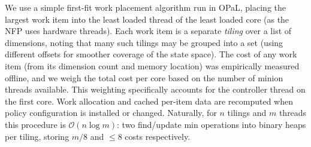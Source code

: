 \documentclass[
sigconf,natbib=false
]{acmart}
\newcommand{\approachshort}{OPaL}
\begin{document}
We use a simple first-fit work placement algorithm run in \approachshort{}, placing the largest work item into the least loaded thread of the least loaded core (as the NFP uses hardware threads).
Each work item is a separate \emph{tiling} over a list of dimensions, noting that many such tilings may be grouped into a set (using different offsets for smoother coverage of the state space).
The cost of any work item (from its dimension count and memory location) was empirically measured offline, and we weigh the total cost per core based on the number of minion threads available.
This weighting specifically accounts for the controller thread on the first core.
Work allocation and cached per-item data are recomputed when policy configuration is installed or changed.
Naturally, for $n$ tilings and $m$ threads this procedure is $\mathcal{O}{\left(n\log{m}\right)}$: two find/update min operations into binary heaps per tiling, storing $m/8$ and $\le8$ costs respectively.

%

%
%
%
\end{document}
